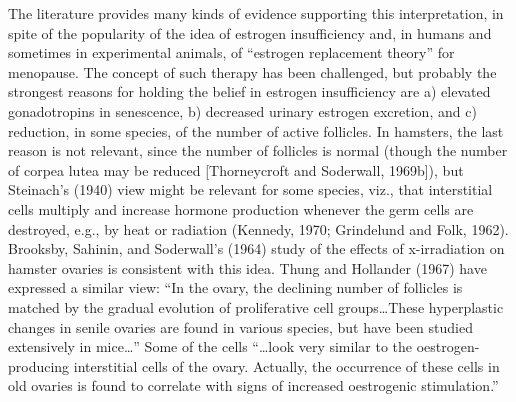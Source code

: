 The literature provides many kinds of evidence supporting this interpretation, in spite of the popularity of the idea of estrogen insufficiency and, in humans and sometimes in experimental animals, of ``estrogen replacement theory'' for menopause. The concept of
such therapy has been challenged, but probably the strongest reasons for holding the belief in estrogen insufficiency are a) elevated gonadotropins in senescence, b) decreased urinary estrogen excretion, and c) reduction, in some species, of the number of active follicles. In
hamsters, the last reason is not relevant, since the number of follicles is normal (though the number of corpea lutea may be reduced [Thorneycroft and Soderwall, 1969b]), but Steinach's (1940) view might be relevant for some species, viz., that interstitial cells multiply
and increase hormone production whenever the germ cells are destroyed, e.g., by heat or radiation (Kennedy, 1970; Grindelund and Folk, 1962). Brooksby, Sahinin, and Soderwall's (1964) study of the effects of x-irradiation on hamster ovaries is consistent with this idea. Thung
and Hollander (1967) have expressed a similar view: ``In the ovary, the declining number of follicles is matched by the gradual evolution of proliferative cell groups\dots These hyperplastic changes in senile ovaries are found in various species, but have been studied extensively in mice\dots'' Some
of the cells ``\dots look very similar to the oestrogen-producing interstitial cells of the ovary. Actually, the occurrence of these cells in old ovaries is found to correlate with signs of increased oestrogenic stimulation.''

